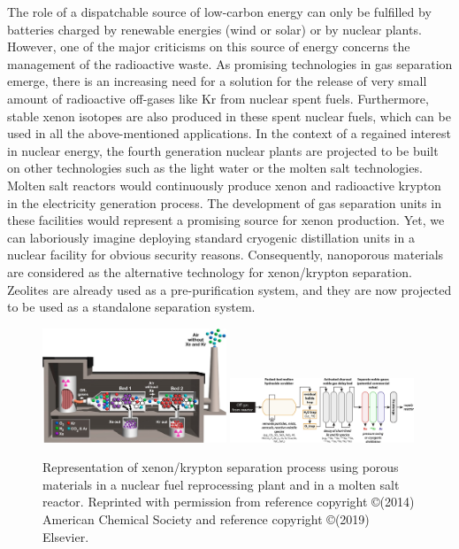 \documentclass[main.tex]{subfiles}
\begin{document}
The role of a dispatchable source of low-carbon energy can only be fulfilled by batteries charged by renewable energies (wind or solar) or by nuclear plants. However, one of the major criticisms on this source of energy concerns the management of the radioactive waste. As promising technologies in gas separation emerge, there is an increasing need for a solution for the release of very small amount of radioactive off-gases like Kr from nuclear spent fuels.\cite{Blomeke_1969} Furthermore, stable xenon isotopes are also produced in these spent nuclear fuels, which can be used in all the above-mentioned applications. In the context of a regained interest in nuclear energy, the fourth generation nuclear plants are projected to be built on other technologies such as the light water or the molten salt technologies.\cite{LeBlanc_2010} Molten salt reactors would continuously produce xenon and radioactive krypton in the electricity generation process.\cite{Riley_2019} The development of gas separation units in these facilities would represent a promising source for xenon production. Yet, we can laboriously imagine deploying standard cryogenic distillation units in a nuclear facility for obvious security reasons. Consequently, nanoporous materials are considered as the alternative technology for xenon/krypton separation. Zeolites are already used as a pre-purification system,\cite{kerry2007industrial} and they are now projected to be used as a standalone separation system. 

\begin{figure}[ht]
  \includegraphics[width=0.49\textwidth]{figures/1-screening/Kr_treatment.jpg}
  \includegraphics[width=0.49\textwidth]{figures/1-screening/MSR_noble_gas.jpg}
  \caption{Representation of xenon/krypton separation process using porous materials in a nuclear fuel reprocessing plant and in a molten salt reactor. Reprinted with permission from reference  copyright \copyright (2014) American Chemical Society and reference  copyright \copyright (2019) Elsevier.}
  \label{fgr:industrial}
\end{figure}
\end{document}
